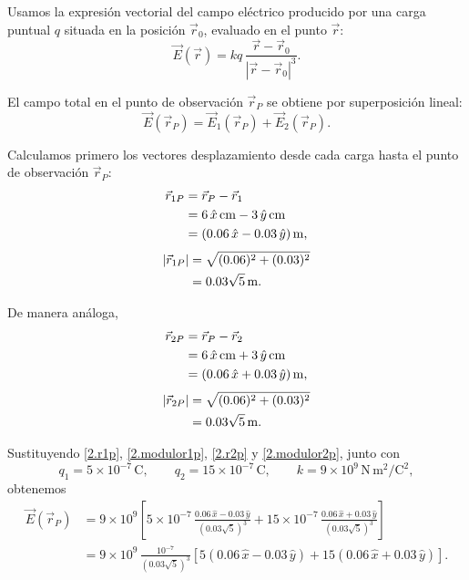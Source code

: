 \documentclass[11pt]{article}
\begin{document}
Usamos la expresión vectorial del campo eléctrico producido por una carga puntual $q$ situada en la posición $\vec r_0$, evaluado en el punto $\vec r$:
\begin{equation}\label{2.campo-electrico-formula}
\vec E(\vec r)=kq\,\frac{\vec r-\vec r_0}{|\vec r-\vec r_0|^3}.
\end{equation}

El campo total en el punto de observación $\vec r_P$ se obtiene por superposición lineal:
\begin{equation*}
\vec E(\vec r_P)=\vec E_1(\vec r_P)+\vec E_2(\vec r_P).
\end{equation*}

Calculamos primero los vectores desplazamiento desde cada carga hasta el punto de observación $\vec r_P$:
\begin{align}
\vec r_{1P}
&=
\vec r_P-\vec r_1 
\notag\\
&=
6\,\hat x\,\mathrm{cm}-3\,\hat y\,\mathrm{cm} 
\notag\\
&=
(0.06\,\hat x-0.03\,\hat y)\,\mathrm{m},
\label{2.r1p}
\end{align}
\begin{align}
|\vec r_{1P}|
&=
\sqrt{(0.06)^2+(0.03)^2} 
\notag\\
&=
0.03\sqrt{5}\,\mathrm{m}.
\label{2.modulor1p}
\end{align}

De manera análoga,
\begin{align}
\vec r_{2P}
&=
\vec r_P-\vec r_2 
\notag\\
&=
6\,\hat x\,\mathrm{cm}+3\,\hat y\,\mathrm{cm} 
\notag\\
&=
(0.06\,\hat x+0.03\,\hat y)\,\mathrm{m},
\label{2.r2p}
\end{align}
\begin{align}
|\vec r_{2P}|
&=
\sqrt{(0.06)^2+(0.03)^2} 
\notag\\
&=
0.03\sqrt{5}\,\mathrm{m}.
\label{2.modulor2p}
\end{align}

Sustituyendo \eqref{2.r1p}, \eqref{2.modulor1p}, \eqref{2.r2p} y \eqref{2.modulor2p}, junto con
\begin{equation*}
q_1=5\times 10^{-7}\,\mathrm{C},
\qquad
q_2=15\times 10^{-7}\,\mathrm{C},
\qquad
k=9\times 10^9\,\mathrm{N\,m^2/C^2},
\end{equation*}
obtenemos
\begin{align*}
\vec E(\vec r_P)
&=
9\times 10^9\left[
5\times 10^{-7}\,
\frac{0.06\,\hat x-0.03\,\hat y}{(0.03\sqrt{5})^3}
+
15\times 10^{-7}\,
\frac{0.06\,\hat x+0.03\,\hat y}{(0.03\sqrt{5})^3}
\right] \\
&=
9\times 10^9\,
\frac{10^{-7}}{(0.03\sqrt{5})^3}
\left[
5(0.06\,\hat x-0.03\,\hat y)
+
15(0.06\,\hat x+0.03\,\hat y)
\right].
\end{align*}
\end{document}
